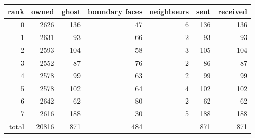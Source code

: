 \footnotesize
\begin{tabular}{rrrrrrr}
\toprule
rank & owned & ghost & boundary faces & neighbours & sent & received\\
\midrule
0 & 2626 & 136 & 47 & 6 & 136 & 136\\
1 & 2631 & 93 & 66 & 2 & 93 & 93\\
2 & 2593 & 104 & 58 & 3 & 105 & 104\\
3 & 2552 & 87 & 76 & 2 & 86 & 87\\
4 & 2578 & 99 & 63 & 2 & 99 & 99\\
5 & 2578 & 102 & 64 & 4 & 102 & 102\\
6 & 2642 & 62 & 80 & 2 & 62 & 62\\
7 & 2616 & 188 & 30 & 5 & 188 & 188\\
\midrule
total & 20816 & 871 & 484 & & 871 & 871\\
\bottomrule
\end{tabular}

